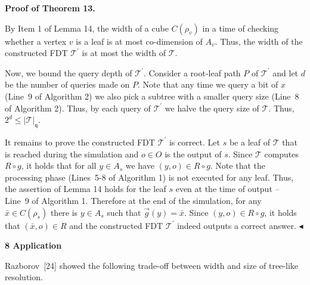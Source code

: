 \documentclass[10pt,a4paper]{article}
\begin{document}
\par\medskip\noindent\textbf{Proof of Theorem 13.}\par




By Item 1 of Lemma 14, the width of a cube $C(\rho_{v})$ in a time of checking whether a vertex $v$ is a leaf is at most co-dimension of $A_{v}$.
Thus, the width of the constructed FDT $\mathcal{T}^{\prime}$ is at most the width of $\mathcal{T}$.\par




Now, we bound the query depth of $\mathcal{T}^{\prime}$.
Consider a root-leaf path $P$ of $\mathcal{T}^{\prime}$ and let $d$ be the number of queries made on $P$.
Note that any time we query a bit of $x$ (Line 9 of Algorithm 2) we also pick a subtree with a smaller query size (Line 8 of Algorithm 2).
Thus, by each query of $\mathcal{T}^{\prime}$ we halve the query size of $\mathcal{T}$.
Thus, $2^{d}\leq|\mathcal{T}|_{\mathsf{q}}$.\par




It remains to prove the constructed FDT $\mathcal{T}^{\prime}$ is correct.
Let $s$ be a leaf of $\mathcal{T}$ that is reached during the simulation and $o\in O$ is the output of $s$.
Since $\mathcal{T}$ computes $R\circ g$, it holds that for all $y\in A_{s}$ we have $(y,o)\in R\circ g$.
Note that the processing phase (Lines 5-8 of Algorithm 1) is not executed for any leaf.
Thus, the assertion of Lemma 14 holds for the leaf $s$ even at the time of output – Line 9 of Algorithm 1.
Therefore at the end of the simulation, for any $\bar{x}\in C(\rho_{s})$ there is $y\in A_{s}$ such that $\overrightarrow{g}(y)=\bar{x}$.
Since $(y,o)\in R\circ g$, it holds that $(\bar{x},o)\in R$ and the constructed FDT $\mathcal{T}^{\prime}$ indeed outputs a correct answer.
$\blacktriangleleft$\par







\par\medskip\noindent\textbf{
8 Application}\par




Razborov [24] showed the following trade-off between width and size of tree-like resolution.\par



\end{document}
